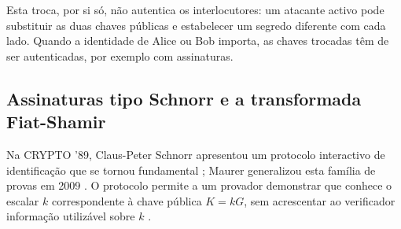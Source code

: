 Esta troca, por si só, não autentica os interlocutores: um atacante activo
pode substituir as duas chaves públicas e estabelecer um segredo diferente com
cada lado. Quando a identidade de Alice ou Bob importa, as chaves trocadas têm
de ser autenticadas, por exemplo com assinaturas.




\subsection{Assinaturas tipo Schnorr e a transformada Fiat-Shamir} 
\label{sec:schnorr-fiat-shamir}

Na CRYPTO '89, Claus-Peter Schnorr apresentou um protocolo interactivo de
identificação que se tornou fundamental \cite{schnorr-signatures}; Maurer
generalizou esta família de provas em 2009 \cite{simple-zk-proof-maurer}. O
protocolo permite a
um provador demonstrar que conhece o escalar \(k\) correspondente à chave
pública \(K=kG\), sem acrescentar ao verificador informação utilizável sobre
\(k\) \cite{Signatures2015BorromeanRS}.

